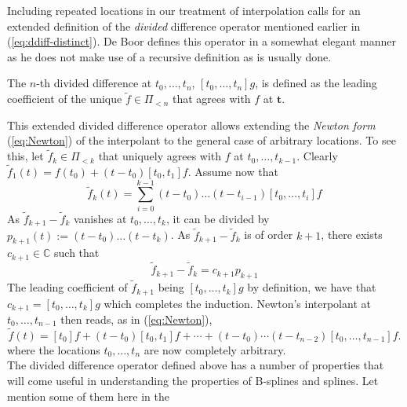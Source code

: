 Including repeated locations in our treatment of interpolation calls for an extended definition of the \emph{divided} 
difference operator mentioned earlier in (\ref{eq:ddiff-distinct}). De Boor defines this operator in a somewhat elegant 
manner as he does not make use of a recursive definition as is usually done.

\begin{deftn}
  The $n$-th divided difference at $t_0, \ldots, t_n$, $[t_0, \ldots, t_n]g$, is defined as the leading coefficient of 
  the unique $\tilde{f} \in \Pi_{<n}$ that agrees with $f$ at $\bm{t}$.
\end{deftn}

This extended divided difference operator allows extending the \emph{Newton form} (\ref{eq:Newton}) of the interpolant 
to the general case of arbitrary locations. To see this, let $\tilde{f}_k \in \Pi_{<k}$ that uniquely agrees with $f$ at 
$t_0, \ldots, t_{k-1}$. Clearly $\tilde{f}_1(t) = f(t_0) + (t-t_0)[t_0, t_1]f$. Assume now that
\begin{equation*}
  \tilde{f}_k(t) = \sum_{i=0}^{k-1} (t-t_0)\ldots(t-t_{i-1})[t_0, \ldots, t_i]f
\end{equation*}
As $\tilde{f}_{k+1} - \tilde{f}_k$ vanishes at $t_0, \ldots, t_k$, it can be divided by 
$p_{k+1}(t):=(t-t_0)\ldots(t-t_k)$.  As $\tilde{f}_{k+1}- \tilde{f}_{k}$ is of order $k+1$, there exists $c_{k+1} \in 
\mathbb{C}$ such that 
\begin{equation*}
  \tilde{f}_{k+1} - \tilde{f}_{k} = c_{k+1}p_{k+1}
\end{equation*}
The leading coefficient of $\tilde{f}_{k+1}$ being $[t_0, \ldots, t_k]g$ by definition, we have that $c_{k+1}=[t_0, 
\ldots, t_k]g$ which completes the induction. Newton's interpolant at $t_0, \ldots, t_{n-1}$ then reads, as in 
(\ref{eq:Newton}),
\begin{equation*}
  \tilde{f}(t) = [t_0]f + (t-t_0)[t_0, t_1]f + \cdots + (t-t_0)\cdots(t-t_{n-2})[t_0, \ldots, t_{n-1}]f.
\end{equation*}
where the locations $t_0, \ldots, t_n$ are now completely arbitrary. \\ 

The divided difference operator defined above has a number of properties that will come useful in understanding the 
properties of B-splines and splines. Let mention some of them here in the

